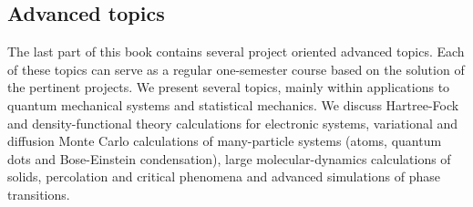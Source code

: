% 
%
%

\begin{partbacktext}
\part{Advanced topics}
The last part of this book contains several project oriented advanced topics.
Each of these topics can serve as a regular one-semester course based on the 
solution of the pertinent projects.  We present several topics, mainly within
applications to quantum mechanical systems and statistical mechanics. 
We discuss Hartree-Fock and density-functional theory 
calculations for electronic systems, variational
and diffusion Monte Carlo calculations of many-particle systems
(atoms, quantum dots and Bose-Einstein condensation), large molecular-dynamics
calculations of solids, percolation and critical phenomena and advanced
simulations of phase transitions.
\end{partbacktext}
